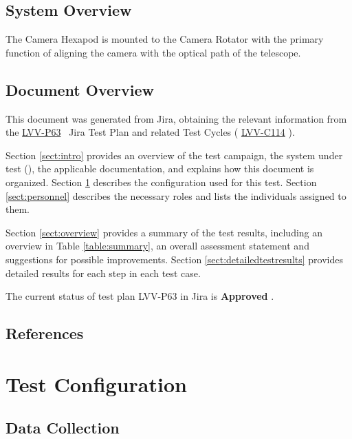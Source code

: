 \documentclass[SE,lsstdraft,STR,toc]{lsstdoc}
\begin{document}
\subsection{System Overview}
\label{sect:systemoverview}

 The Camera Hexapod is mounted to the Camera Rotator with the primary
function of aligning the camera with the optical path of the telescope.


\subsection{Document Overview}
\label{sect:docoverview}

This document was generated from Jira, obtaining the relevant information from the 
\href{https://jira.lsstcorp.org/secure/Tests.jspa#/testPlan/LVV-P63}{LVV-P63}
~Jira Test Plan and related Test Cycles (
  \href{https://jira.lsstcorp.org/secure/Tests.jspa#/testCycle/LVV-C114}{LVV-C114}
).

Section \ref{sect:intro} provides an overview of the test campaign, the system under test (\product{}), the applicable documentation, and explains how this document is organized.
Section \ref{sect:configuration}  describes the configuration used for this test.
Section \ref{sect:personnel} describes the necessary roles and lists the individuals assigned to them.

Section \ref{sect:overview} provides a summary of the test results, including an overview in Table \ref{table:summary}, an overall assessment statement and suggestions for possible improvements.
Section \ref{sect:detailedtestresults} provides detailed results for each step in each test case.

The current status of test plan LVV-P63 in Jira is \textbf{ Approved }.

\subsection{References}
\label{sect:references}
\renewcommand{\refname}{}

\section{Test Configuration}
\label{sect:configuration}

\subsection{Data Collection}
\end{document}

